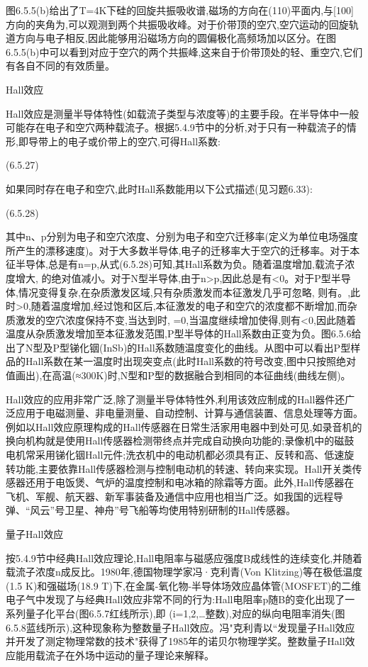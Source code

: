 图6.5.5(b)给出了T=4K下硅的回旋共振吸收谱,磁场的方向在(110)平面内,与[100]方向的夹角为,可以观测到两个共振吸收峰。对于价带顶的空穴,空穴运动的回旋轨道方向与电子相反,因此能够用沿磁场方向的圆偏极化高频场加以区分。在图6.5.5(b)中可以看到对应于空穴的两个共振峰,这来自于价带顶处的轻、重空穴,它们有各自不同的有效质量。

Hall效应

Hall效应是测量半导体特性(如载流子类型与浓度等)的主要手段。在半导体中一般可能存在电子和空穴两种载流子。根据5.4.9节中的分析,对于只有一种载流子的情形,即导带上的电子或价带上的空穴,可得Hall系数:

 	(6.5.27)

如果同时存在电子和空穴,此时Hall系数能用以下公式描述(见习题6.33):

 	(6.5.28)

其中n、p分别为电子和空穴浓度、分别为电子和空穴迁移率(定义为单位电场强度所产生的漂移速度)。对于大多数半导体,电子的迁移率大于空穴的迁移率。对于本征半导体,总是有n=p,从式(6.5.28)可知,其Hall系数为负。随着温度增加,载流子浓度增大, 的绝对值减小。对于N型半导体,由于n>p,因此总是有<0。对于P型半导体,情况变得复杂,在杂质激发区域,只有杂质激发而本征激发几乎可忽略, 则有。,此时>0,随着温度增加,经过饱和区后,本征激发的电子和空穴的浓度都不断增加,而杂质激发的空穴浓度保持不变,当达到时, =0,当温度继续增加使得,则有<0,因此随着温度从杂质激发增加至本征激发范围,P型半导体的Hall系数由正变为负。图6.5.6给出了N型及P型锑化铟(InSb)的Hall系数随温度变化的曲线。从图中可以看出P型样品的Hall系数在某一温度时出现突变点(此时Hall系数的符号改变,图中只按照绝对值画出),在高温(≈300K)时,N型和P型的数据融合到相同的本征曲线(曲线左侧)。



Hall效应的应用非常广泛,除了测量半导体特性外,利用该效应制成的Hall器件还广泛应用于电磁测量、非电量测量、自动控制、计算与通信装置、信息处理等方面。例如以Hall效应原理构成的Hall传感器在日常生活家用电器中到处可见,如录音机的换向机构就是使用Hall传感器检测带终点并完成自动换向功能的;录像机中的磁鼓电机常采用锑化铟Hall元件;洗衣机中的电动机都必须具有正、反转和高、低速旋转功能,主要依靠Hall传感器检测与控制电动机的转速、转向来实现。Hall开关类传感器还用于电饭煲、气炉的温度控制和电冰箱的除霜等方面。此外,Hall传感器在飞机、军舰、航天器、新军事装备及通信中应用也相当广泛。如我国的远程导弹、“风云”号卫星、神舟”号飞船等均使用特别研制的Hall传感器。

量子Hall效应

按5.4.9节中经典Hall效应理论,Hall电阻率与磁感应强度B成线性的连续变化,并随着载流子浓度n成反比。1980年,德国物理学家冯·克利青(Von Klitzing)等在极低温度(1.5 K)和强磁场(18.9 T)下,在金属-氧化物-半导体场效应晶体管(MOSFET)的二维电子气中发现了与经典Hall效应非常不同的行为:Hall电阻率p随B的变化出现了一系列量子化平台(图6.5.7红线所示),即 (i=1,2,…整数),对应的纵向电阻率消失(图6.5.8蓝线所示),这种现象称为整数量子Hall效应。冯"克利青以“发现量子Hall效应并开发了测定物理常数的技术"获得了1985年的诺贝尔物理学奖。整数量子Hall效应能用载流子在外场中运动的量子理论来解释。

